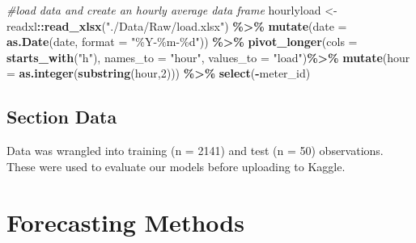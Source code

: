 \documentclass[
]{article}
\newenvironment{Shaded}{\begin{snugshade}}{\end{snugshade}}
\newcommand{\AttributeTok}[1]{\textcolor[rgb]{0.13,0.29,0.53}{#1}}
\newcommand{\CommentTok}[1]{\textcolor[rgb]{0.56,0.35,0.01}{\textit{#1}}}
\newcommand{\DecValTok}[1]{\textcolor[rgb]{0.00,0.00,0.81}{#1}}
\newcommand{\FunctionTok}[1]{\textcolor[rgb]{0.13,0.29,0.53}{\textbf{#1}}}
\newcommand{\NormalTok}[1]{#1}
\newcommand{\OtherTok}[1]{\textcolor[rgb]{0.56,0.35,0.01}{#1}}
\newcommand{\SpecialCharTok}[1]{\textcolor[rgb]{0.81,0.36,0.00}{\textbf{#1}}}
\newcommand{\StringTok}[1]{\textcolor[rgb]{0.31,0.60,0.02}{#1}}
\begin{document}
\begin{Shaded}
\begin{Highlighting}[]
\CommentTok{\#load data and create an hourly average data frame}
\NormalTok{hourlyload }\OtherTok{\textless{}{-}}\NormalTok{ readxl}\SpecialCharTok{::}\FunctionTok{read\_xlsx}\NormalTok{(}\StringTok{"./Data/Raw/load.xlsx"}\NormalTok{) }\SpecialCharTok{\%\textgreater{}\%}
    \FunctionTok{mutate}\NormalTok{(}\AttributeTok{date =} \FunctionTok{as.Date}\NormalTok{(date, }\AttributeTok{format =} \StringTok{"\%Y{-}\%m{-}\%d"}\NormalTok{)) }\SpecialCharTok{\%\textgreater{}\%}  
    \FunctionTok{pivot\_longer}\NormalTok{(}\AttributeTok{cols =} \FunctionTok{starts\_with}\NormalTok{(}\StringTok{"h"}\NormalTok{),}
                 \AttributeTok{names\_to =} \StringTok{"hour"}\NormalTok{,}
                 \AttributeTok{values\_to =} \StringTok{"load"}\NormalTok{)}\SpecialCharTok{\%\textgreater{}\%}
    \FunctionTok{mutate}\NormalTok{(}\AttributeTok{hour =} \FunctionTok{as.integer}\NormalTok{(}\FunctionTok{substring}\NormalTok{(hour,}\DecValTok{2}\NormalTok{))) }\SpecialCharTok{\%\textgreater{}\%}
    \FunctionTok{select}\NormalTok{(}\SpecialCharTok{{-}}\NormalTok{meter\_id)}
\end{Highlighting}
\end{Shaded}

\subsection{Section Data}\label{section-data}

Data was wrangled into training (n = 2141) and test (n = 50)
observations. These were used to evaluate our models before uploading to
Kaggle.

\begin{Shaded}
\end{Shaded}

\section{Forecasting Methods}\label{forecasting-methods}
\end{document}
